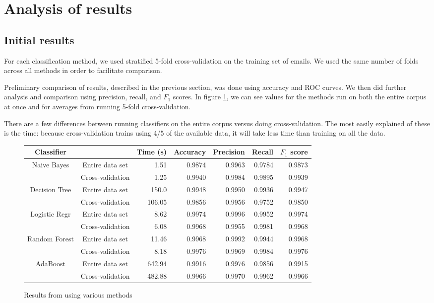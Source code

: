 \documentclass{article} %
\begin{document}
\section{Analysis of results}
\subsection{Initial results}
For each classification method, we used stratified 5-fold cross-validation on the training set of emails. We used the same number of folds across all methods in order to facilitate comparison.

Preliminary comparison of results, described in the previous section, was done using accuracy and ROC curves. We then did further analysis and comparison using precision, recall, and $F_1$ scores. In figure \ref{fig:table}, we can see values for the methods run on both the entire corpus at once and for averages from running 5-fold cross-validation. 

There are a few differences between running classifiers on the entire corpus versus doing cross-validation. The most easily explained of these is the time: because cross-validation trains using 4/5 of the available data, it will take less time than training on all the data. 

\begin{figure}[h]
  \begin{tabular}[h]{ | c | c | r | r | r | r | r | }
    \hline
    Classifier    &                  & Time (s) & Accuracy & Precision & Recall & $F_1$ score  \\ \hline
    Naive Bayes   & Entire data set  & 1.51     & 0.9874   & 0.9963    & 0.9784 & 0.9873 \\ \cline{2-7}
                  & Cross-validation & 1.25     & 0.9940   & 0.9984    & 0.9895 & 0.9939 \\ \hline
    Decision Tree & Entire data set  & 150.0    & 0.9948   & 0.9950    & 0.9936 & 0.9947 \\ \cline{2-7}
                  & Cross-validation & 106.05   & 0.9856   & 0.9956    & 0.9752 & 0.9850 \\ \hline
    Logistic Regr & Entire data set  & 8.62     & 0.9974   & 0.9996    & 0.9952 & 0.9974 \\ \cline{2-7}
                  & Cross-validation & 6.08     & 0.9968   & 0.9955    & 0.9981 & 0.9968 \\ \hline
    Random Forest & Entire data set  & 11.46    & 0.9968   & 0.9992    & 0.9944 & 0.9968 \\ \cline{2-7}
                  & Cross-validation & 8.18     & 0.9976   & 0.9969    & 0.9984 & 0.9976 \\ \hline
    AdaBoost      & Entire data set  & 642.94   & 0.9916   & 0.9976    & 0.9856 & 0.9915 \\ \cline{2-7}
                  & Cross-validation & 482.88   & 0.9966   & 0.9970    & 0.9962 & 0.9966 \\ \hline
  \end{tabular}
  \caption{Results from using various methods}
  \label{fig:table}
\end{figure}
\end{document}

